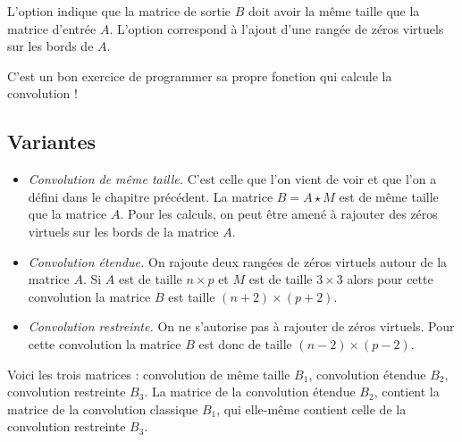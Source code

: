 \documentclass[11pt,class=report,crop=false]{standalone}
\begin{document}
L'option  indique que la matrice de sortie $B$ doit avoir la même taille que la matrice d'entrée $A$.
L'option  correspond à l'ajout d'une rangée de zéros virtuels sur les bords de $A$.

C'est un bon exercice de programmer sa propre fonction qui calcule la convolution !

\subsection{Variantes}

\begin{itemize}
  \item \emph{Convolution de même taille.}
  C'est celle que l'on vient de voir et que l'on a défini dans le chapitre précédent. La matrice $B = A \star M$ est de même taille que la matrice $A$. Pour les calculs, on peut être amené à rajouter des zéros virtuels sur les bords de la matrice $A$.


  
  \item \emph{Convolution étendue.} On rajoute deux rangées de zéros virtuels autour de la matrice $A$. Si $A$ est de taille $n\times p$ et $M$ est de taille $3\times 3$ alors pour cette convolution la matrice $B$ est taille $(n+2) \times (p+2)$.
  


    
  \item\emph{Convolution restreinte.} On ne s'autorise pas à rajouter de zéros virtuels. Pour cette convolution la matrice $B$ est donc de taille $(n-2) \times (p-2)$. 
  
  

    
\end{itemize}

Voici les trois matrices : convolution de même taille $B_1$, convolution étendue $B_2$, convolution restreinte $B_3$. La matrice de la convolution étendue $B_2$, contient la matrice de la convolution classique $B_1$, qui elle-même contient celle de la convolution restreinte $B_3$. 
\end{document}
